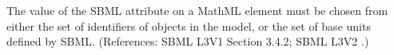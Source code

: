 The value of the SBML attribute  on a MathML 
element must be chosen from either the set of identifiers of
\UnitDefinition objects in the model, or the set of base units defined by
SBML.  (References: SBML L3V1 Section 3.4.2; SBML L3V2 .)
